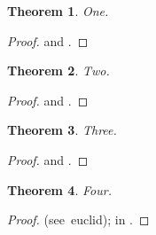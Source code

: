 \documentclass{article}
\newcommand\mycite[1]{(see~#1)}
\newtheorem{theorem}{Theorem}
\begin{document}
\begin{theorem}\label{t1}One.\end{theorem}
\begin{proof}\textcite{knuth} and \parencite[Thm~3]{turing}.\end{proof}
\begin{theorem}\label{t2}Two.\end{theorem}
\begin{proof}\autocite{euclid} and \textcite*{knuth}.\end{proof}
\begin{theorem}\label{t3}Three.\end{theorem}
\begin{proof}\citeauthor{turing} and \parencite[see][p.~7]{euclid}.\end{proof}
\begin{theorem}\label{t4}Four.\end{theorem}
\begin{proof}\mycite{euclid}; \citeauthor{knuth} in \textcite{knuth}.\end{proof}
\printbibliography
\end{document}
